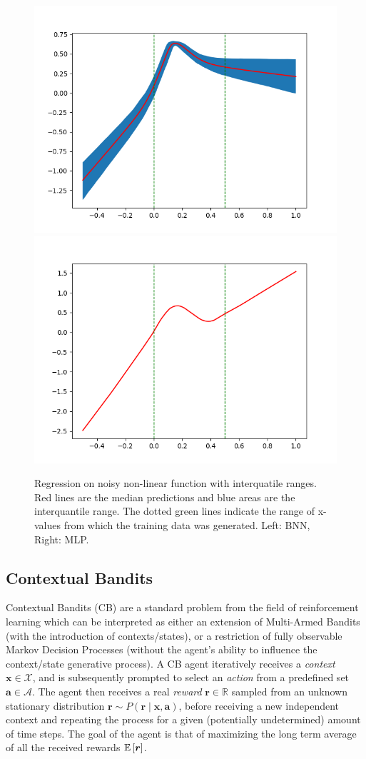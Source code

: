 \documentclass[11pt]{article}
\begin{document}
\begin{figure}
  \centering
  \includegraphics[width=.49\textwidth]{figures/reg_bnn_extended.png}
  \includegraphics[width=.49\textwidth]{figures/reg_mlp_extended.png}
  \caption{Regression on noisy non-linear function with interquatile ranges.
  Red lines are the median predictions and blue areas are the interquantile
  range.  The dotted green lines indicate the range of x-values from which the
  training data was generated.  Left: BNN, Right: MLP.}\label{fig:reg_extended}
\end{figure}

\subsection{Contextual Bandits}

Contextual Bandits (CB) are a standard problem from the field of reinforcement
learning which can be interpreted as either an extension of Multi-Armed Bandits
(with the introduction of contexts/states), or a restriction of fully
observable Markov Decision Processes (without the agent's ability to influence
the context/state generative process).  A CB agent iteratively receives
a \emph{context} $\bm x\in\mathcal{X}$, and is subsequently prompted to select
an \emph{action} from a predefined set $\bm a\in\mathcal{A}$.  The agent then
receives a real \emph{reward} $\bm r\in\mathbb{R}$ sampled from an unknown
stationary distribution $\bm r\sim P(\bm r\mid \bm x, \bm a)$, before receiving
a new independent context and repeating the process for a given (potentially
undetermined) amount of time steps.  The goal of the agent is that of
maximizing the long term average of all the received rewards ${\mathbb{E}}\left[\bm
r\right]$.  
\end{document}

